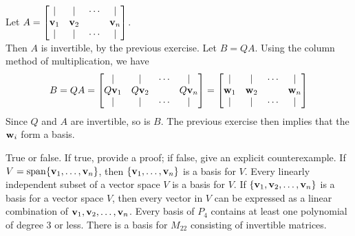 \begin{solution}
\noindent 
Let $A=\begin{bmatrix}
\vert &\vert &\cdots &\vert\\
{\mathbf v}_1&{\mathbf v}_2& &{\mathbf v}_n\\
\vert &\vert &\cdots &\vert
\end{bmatrix}$. \\
Then $A$ is invertible, by the previous exercise. Let $B=QA$. Using the column method of multiplication, we have 
\[
B=QA=\begin{bmatrix}
\vert &\vert &\cdots &\vert\\
Q{\mathbf v}_1&Q{\mathbf v}_2& &Q{\mathbf v}_n\\
\vert &\vert &\cdots &\vert
\end{bmatrix}
=\begin{bmatrix}
\vert &\vert &\cdots &\vert\\
{\mathbf w}_1&{\mathbf w}_2& &{\mathbf w}_n\\
\vert &\vert &\cdots &\vert
\end{bmatrix}
\]
Since $Q$ and $A$ are invertible, so is $B$. The previous exercise then implies that the ${\mathbf w}_i$ form a basis. 
\end{solution} 
\ii True or false. If true, provide a proof; if false, give an explicit counterexample. 
\bb
\ii If $V = \operatorname{span}\{{\mathbf v}_1,\dots ,{\mathbf v}_n\}$, then $\{{\mathbf v}_1,\dots ,{\mathbf v}_n\}$ is a basis for $V$.
\ii Every linearly independent subset of a vector space $V$ is a basis for $V$.
\ii If $\{{\mathbf v}_1, {\mathbf v}_2, \dots , {\mathbf v}_n\}$ is a basis for a vector space $V$, then every vector in $V$ can be expressed as a linear combination of ${\mathbf v}_1, {\mathbf v}_2, \dots , {\mathbf v}_n$.
\ii Every basis of $P_4$ contains at least one polynomial of degree 3 or less.
\ii There is a basis for $M_{22}$ consisting of invertible matrices. 
\ee
